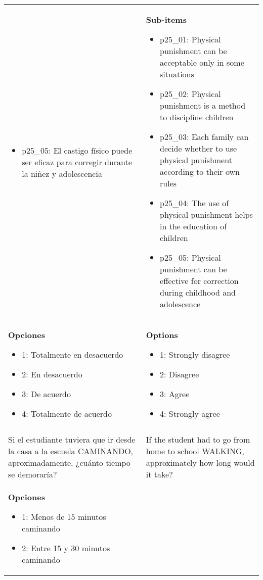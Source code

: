 \documentclass[11pt]{article}
\begin{document}
\begin{longtable}{@{}LL@{}}
\begin{itemize}[leftmargin=*]
\item p25\_05: El castigo físico puede ser eficaz para corregir durante la niñez y adolescencia\end{itemize} & \textbf{Sub-items}\par\begin{itemize}[leftmargin=*]\item p25\_01: Physical punishment can be acceptable only in some situations
\item p25\_02: Physical punishment is a method to discipline children
\item p25\_03: Each family can decide whether to use physical punishment according to their own rules
\item p25\_04: The use of physical punishment helps in the education of children
\item p25\_05: Physical punishment can be effective for correction during childhood and adolescence\end{itemize} \\
\textbf{Opciones}\par\begin{itemize}[leftmargin=*]\item 1: Totalmente en desacuerdo
\item 2: En desacuerdo
\item 3: De acuerdo
\item 4: Totalmente de acuerdo\end{itemize} & \textbf{Options}\par\begin{itemize}[leftmargin=*]\item 1: Strongly disagree
\item 2: Disagree
\item 3: Agree
\item 4: Strongly agree\end{itemize} \\
\addlinespace[4pt]
 \\ 
Si el estudiante tuviera que ir desde la casa a la escuela CAMINANDO, aproximadamente, ¿cuánto tiempo se demoraría? & If the student had to go from home to school WALKING, approximately how long would it take? \\
\textbf{Opciones}\par\begin{itemize}[leftmargin=*]\item 1: Menos de 15 minutos caminando
\item 2: Entre 15 y 30 minutos caminando

\end{itemize}
\end{longtable}
\end{document}
